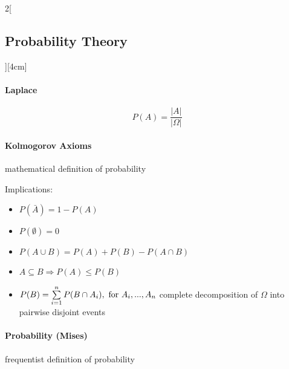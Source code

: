 \documentclass[8pt]{extarticle}
\begin{document}
\begin{multicols}{2}[\subsection{Probability Theory}][4cm]


\paragraph{Laplace}

$$P(A)=\frac{|A|}{|\Omega|}$$


\paragraph{Kolmogorov Axioms} mathematical definition of probability



\begin{Mathfolg}

Implications:
\begin{itemize}
\item $P(\bar{A})=1-P(A)$
\item $P(\emptyset)=0$
\item $P(A\cup B)=P(A)+P(B)-P(A\cap B)$
\item $A \subseteq B \Rightarrow P(A) \le P(B)$
\item $P(B)=\sum\limits_{i=1}^n P(B\cap A_i), \textnormal{ for } A_i,...,A_n$  complete decomposition of $\Omega$  into pairwise disjoint events
\end{itemize}

\end{Mathfolg}

\paragraph{Probability (Mises)} frequentist definition of probability


\end{multicols}
\end{document}
